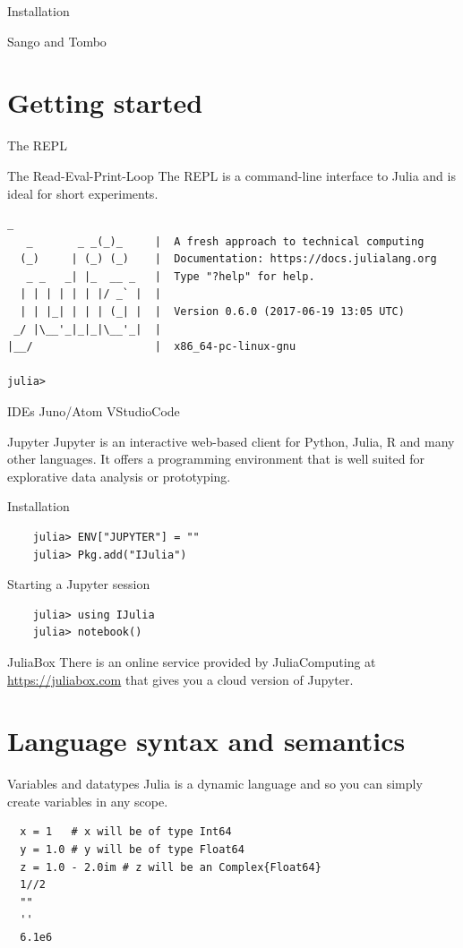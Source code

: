 \documentclass{beamer}
\begin{document}
\begin{frame}{Installation}
\begin{block}{Sango and Tombo}
\section{Getting started}
\begin{frame}[fragile]{The REPL}
  \begin{block}{The Read-Eval-Print-Loop}
    The REPL is a command-line interface to Julia and is ideal for short experiments.
    \begin{Verbatim}[fontsize=\footnotesize]
               _
   _       _ _(_)_     |  A fresh approach to technical computing
  (_)     | (_) (_)    |  Documentation: https://docs.julialang.org
   _ _   _| |_  __ _   |  Type "?help" for help.
  | | | | | | |/ _` |  |
  | | |_| | | | (_| |  |  Version 0.6.0 (2017-06-19 13:05 UTC)
 _/ |\__'_|_|_|\__'_|  |  
|__/                   |  x86_64-pc-linux-gnu

julia> 

\end{Verbatim}
  \end{block}
\end{frame}
\begin{frame}{IDEs}
  Juno/Atom
  VStudioCode
\end{frame}
\begin{frame}[fragile]{Jupyter}
  Jupyter is an interactive web-based client for Python, Julia, R and many other languages.
  It offers a programming environment that is well suited for explorative data analysis or prototyping.
  \begin{block}{Installation}
  \begin{Verbatim}
    julia> ENV["JUPYTER"] = ""
    julia> Pkg.add("IJulia")
    \end{Verbatim}
  \end{block}
  \begin{block}{Starting a Jupyter session}
    \begin{Verbatim}
    julia> using IJulia
    julia> notebook()
    \end{Verbatim}
  \end{block}
  \begin{block}{JuliaBox}
    There is an online service provided by JuliaComputing at \url{https://juliabox.com} that gives you a cloud version of Jupyter.
  \end{block}
\end{frame}
\section{Language syntax and semantics}
\begin{frame}[fragile]{Variables and datatypes}
  Julia is a dynamic language and so you can simply create variables in any scope.
  \begin{Verbatim}
  x = 1   # x will be of type Int64
  y = 1.0 # y will be of type Float64
  z = 1.0 - 2.0im # z will be an Complex{Float64}
  1//2
  ""
  ''
  6.1e6


\end{Verbatim}
\end{frame}
\end{block}
\end{frame}
\end{document}
